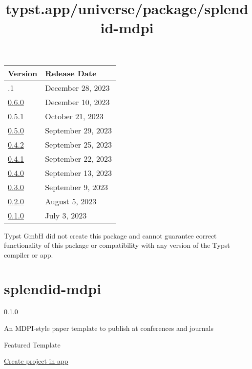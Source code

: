 \begin{longtable}[]{@{}ll@{}}
\toprule\noalign{}
Version & Release Date \\
\midrule\noalign{}
\endhead
\bottomrule\noalign{}
\endlastfoot
0.6.1 & December 28, 2023 \\
\href{https://typst.app/universe/package/ansi-render/0.6.0/}{0.6.0} &
December 10, 2023 \\
\href{https://typst.app/universe/package/ansi-render/0.5.1/}{0.5.1} &
October 21, 2023 \\
\href{https://typst.app/universe/package/ansi-render/0.5.0/}{0.5.0} &
September 29, 2023 \\
\href{https://typst.app/universe/package/ansi-render/0.4.2/}{0.4.2} &
September 25, 2023 \\
\href{https://typst.app/universe/package/ansi-render/0.4.1/}{0.4.1} &
September 22, 2023 \\
\href{https://typst.app/universe/package/ansi-render/0.4.0/}{0.4.0} &
September 13, 2023 \\
\href{https://typst.app/universe/package/ansi-render/0.3.0/}{0.3.0} &
September 9, 2023 \\
\href{https://typst.app/universe/package/ansi-render/0.2.0/}{0.2.0} &
August 5, 2023 \\
\href{https://typst.app/universe/package/ansi-render/0.1.0/}{0.1.0} &
July 3, 2023 \\
\end{longtable}

Typst GmbH did not create this package and cannot guarantee correct
functionality of this package or compatibility with any version of the
Typst compiler or app.


\title{typst.app/universe/package/splendid-mdpi}

\label{banner}
\label{template-thumbnail}

\section{splendid-mdpi}\label{splendid-mdpi}

{ 0.1.0 }

An MDPI-style paper template to publish at conferences and journals

{ } Featured Template

\href{/app?template=splendid-mdpi&version=0.1.0}{Create project in app}

